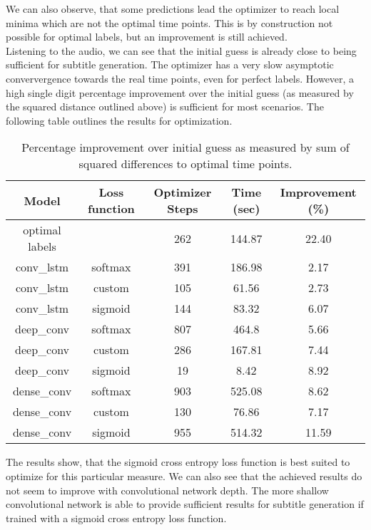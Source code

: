 We can also observe, that some predictions lead the optimizer to reach local minima which are not the optimal time points. This is by construction not possible for optimal labels, but an improvement is still achieved.\\
Listening to the audio, we can see that the initial guess is already close to being sufficient for subtitle generation. The optimizer has a very slow asymptotic conververgence towards the real time points, even for perfect labels. However, a high single digit percentage improvement over the initial guess (as measured by the squared distance outlined above) is sufficient for most scenarios.
The following table outlines the results for optimization.

\FloatBarrier
\begin{table}[ht]
	\centering
	\begin{tabular}{ccccc}
		\toprule
		Model & Loss function & Optimizer Steps & Time (sec) & Improvement (\%)\\
		\midrule
		optimal labels &  & 262 & 144.87 & 22.40 \\
		conv\_lstm  & softmax  & 391 & 186.98 & 2.17 \\
		conv\_lstm  & custom   & 105 & 61.56 & 2.73 \\
		conv\_lstm  & sigmoid  & 144 & 83.32 & 6.07 \\
		deep\_conv  & softmax  & 807 & 464.8 & 5.66 \\
		deep\_conv  & custom   & 286 & 167.81 & 7.44 \\
		deep\_conv  & sigmoid  & 19 & 8.42 & 8.92 \\
		dense\_conv & softmax  & 903 & 525.08 & 8.62 \\
		dense\_conv & custom   & 130 & 76.86 & 7.17 \\
		dense\_conv & sigmoid  & 955 & 514.32 & 11.59 \\
		\bottomrule
	\end{tabular}
	\caption{Percentage improvement over initial guess as measured by sum of squared differences to optimal time points.}
\end{table}
\FloatBarrier

The results show, that the sigmoid cross entropy loss function is best suited to optimize for this particular measure. We can also see that the achieved results do not seem to improve with convolutional network depth. The more shallow convolutional network is able to provide sufficient results for subtitle generation if trained with a sigmoid cross entropy loss function.









